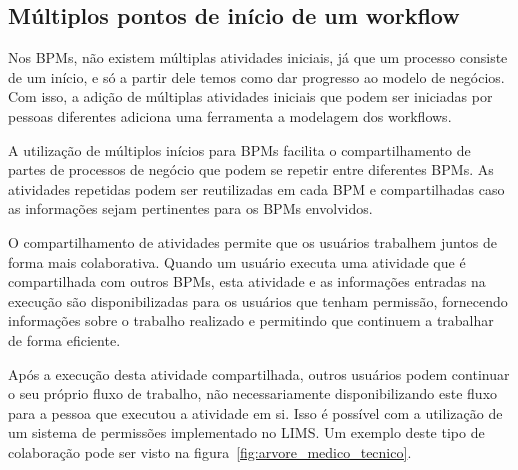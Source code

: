 \subsection{Múltiplos pontos de início de um workflow}




Nos BPMs, não existem múltiplas atividades iniciais, já que um processo consiste de um início, e só a partir dele temos como dar progresso ao modelo de negócios. Com isso, a adição de múltiplas atividades iniciais que podem ser iniciadas por pessoas diferentes adiciona uma ferramenta a modelagem dos workflows.


A utilização de múltiplos inícios para BPMs facilita o compartilhamento de partes de processos de negócio que podem se repetir entre diferentes BPMs. As atividades repetidas podem ser reutilizadas em cada BPM e compartilhadas caso as informações sejam pertinentes para os BPMs envolvidos.

O compartilhamento de atividades permite que os usuários trabalhem juntos de forma mais colaborativa. Quando um usuário executa uma atividade que é compartilhada com outros BPMs, esta atividade e as informações entradas na execução são disponibilizadas para os usuários que tenham permissão, fornecendo informações sobre o trabalho realizado e permitindo que continuem a trabalhar de forma eficiente.

Após a execução desta atividade compartilhada, outros usuários podem continuar o seu próprio fluxo de trabalho, não necessariamente disponibilizando este fluxo para a pessoa que executou a atividade em si. Isso é possível com a utilização de um sistema de permissões implementado no LIMS. Um exemplo deste tipo de colaboração pode ser visto na figura~\ref{fig:arvore_medico_tecnico}.

